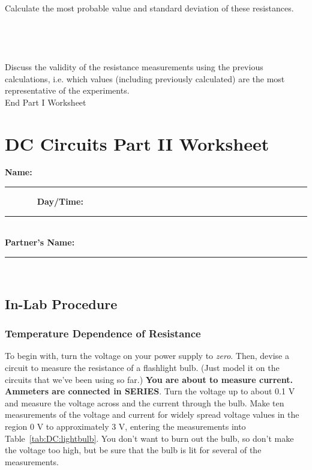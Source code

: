 \noindent Calculate the most probable value and standard deviation of
these resistances.  \\
\\ 
\vspace*{1cm} \\
\\ 
\vspace*{1.3cm} \\                                               

\noindent Discuss the validity of the resistance measurements using the 
previous calculations, i.e. which values (including previously calculated) 
are the most representative of the experiments. \\
\vfill
{\Large End Part I Worksheet}

\newpage

\renewcommand{\thesection}{\thechapter.W2}

\section{DC Circuits Part II Worksheet}


{\bf \Large Name:}~ \rule{5cm}{.1mm}~~~~~~~
{\bf \Large Day/Time:}~\rule{3cm}{.1mm}\\
{\bf \Large Partner's Name:}~\rule{6cm}{.1mm}\\
\subsection{In-Lab Procedure}
\subsubsection{Temperature Dependence of Resistance}
\label{sec:DC:tdep}
To begin with, turn the voltage on your power supply to {\it zero}.
Then, devise a circuit to measure the resistance of a flashlight bulb. (Just 
model it on the circuits that we've been using so far.) 
{\bf You are about
to measure current.  Ammeters are connected in SERIES}.  Turn the voltage up to
about 0.1 V and measure the voltage across and the current through the bulb. 
Make ten measurements of the voltage and current for widely 
spread voltage values in the region 0 V to approximately 3 V, entering
the measurements into Table~\ref{tab:DC:lightbulb}.  You don't want 
to burn out the bulb, so don't make the voltage too high, but be sure that the 
bulb is lit for several of the measurements.  \\

